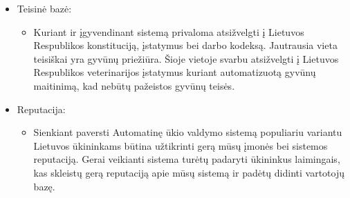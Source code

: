 \documentclass[oneside]{VUMIFPSkursinis}
\begin{document}
\begin{itemize}
\begin{itemize}
		\end{itemize}
		\item{Teisinė bazė: }
		\begin{itemize}
			\item{Kuriant ir įgyvendinant sistemą privaloma atsižvelgti į Lietuvos Respublikos konstituciją, įstatymus bei darbo kodeksą. Jautrausia vieta teisiškai yra gyvūnų priežiūra. Šioje vietoje svarbu atsižvelgti į Lietuvos Respublikos veterinarijos įstatymus kuriant automatizuotą gyvūnų maitinimą, kad nebūtų pažeistos gyvūnų teisės. }
		\end{itemize}
		\item{Reputacija: }
		\begin{itemize}
			\item{Sienkiant paversti Automatinę ūkio valdymo sistemą populiariu variantu Lietuvos ūkininkams būtina užtikrinti gerą mūsų įmonės bei sistemos reputaciją. Gerai veikianti sistema turėtų padaryti ūkininkus laimingais, kas skleistų gerą reputaciją apie mūsų sistemą ir padėtų didinti vartotojų bazę. }
		\end{itemize}
	\end{itemize}
	
	
\pagebreak
\end{document}
